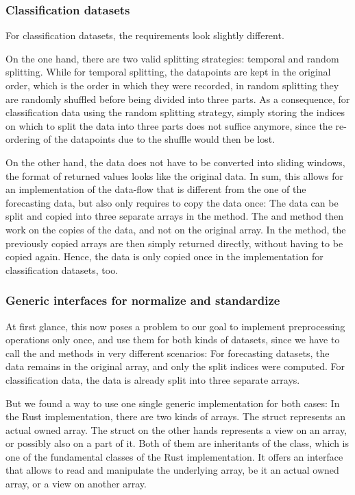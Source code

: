 \documentclass[review]{AIM_report}
\begin{document}
\subsubsection{Classification datasets}

For classification datasets, the requirements look slightly different.

On the one hand, there are two valid splitting strategies: temporal and random splitting. While for temporal splitting, the datapoints are kept in the original order, which is the order in which they were recorded, in random splitting they are randomly shuffled before being divided into three parts. As a consequence, for classification data using the random splitting strategy, simply storing the indices on which to split the data into three parts does not suffice anymore, since the re-ordering of the datapoints due to the shuffle would then be lost.

On the other hand, the data does not have to be converted into sliding windows, the format of returned values looks like the original data. In sum, this allows for an implementation of the data-flow that is different from the one of the forecasting data, but also only requires to copy the data once: The data can be split and copied into three separate arrays in the \splitShort method. The \normalize and \standardize method then work on the copies of the data, and not on the original array. In the \collect method, the previously copied arrays are then simply returned directly, without having to be copied again. Hence, the data is only copied once in the implementation for classification datasets, too.

\subsubsection{Generic interfaces for normalize and standardize}

At first glance, this now poses a problem to our goal to implement preprocessing operations only once, and use them for both kinds of datasets, since we have to call the \normalize and \standardize methods in very different scenarios: For forecasting datasets, the data remains in the original array, and only the split indices were computed. For classification data, the data is already split into three separate arrays.

But we found a way to use one single generic implementation for both cases: In the Rust \numpy implementation, there are two kinds of arrays. The struct \arrayrust represents an actual owned array. The struct \arrayview on the other hands represents a view on an array, or possibly also on a part of it. Both of them are inheritants of the \arraybase class, which is one of the fundamental classes of the Rust \numpy implementation. It offers an interface that allows to read and manipulate the underlying array, be it an actual owned array, or a view on another array.
\end{document}
